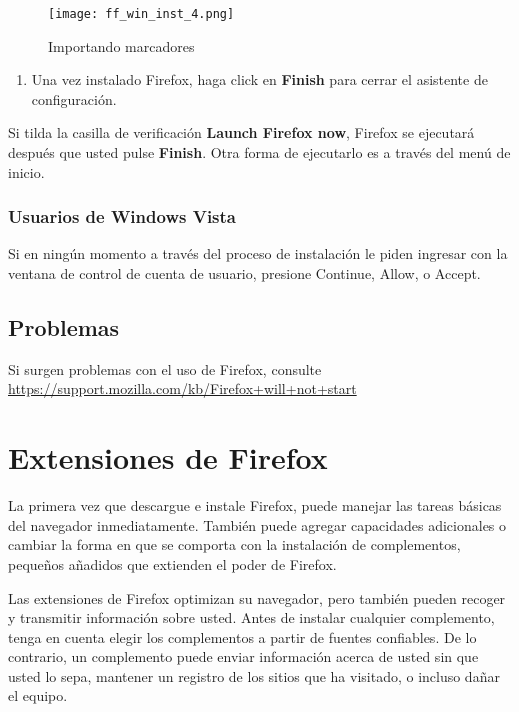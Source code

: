\documentclass[10pt,a5paper,twoside,,]{book}
\providecommand{\tightlist}{%
  \setlength{\itemsep}{0pt}\setlength{\parskip}{0pt}}
\begin{document}
\begin{figure}[htbp]
\centering
\texttt{[image: ff\_win\_inst\_4.png]}
\caption{Importando marcadores}
\end{figure}

\begin{enumerate}
\def\labelenumi{\arabic{enumi}.}
\setcounter{enumi}{7}
\tightlist
\item
  Una vez instalado Firefox, haga click en \textbf{Finish} para cerrar
  el asistente de configuración.
\end{enumerate}

Si tilda la casilla de verificación \textbf{Launch Firefox now}, Firefox
se ejecutará después que usted pulse \textbf{Finish}. Otra forma de
ejecutarlo es a través del menú de inicio.

\subsection{Usuarios de Windows Vista}\label{usuarios-de-windows-vista}

Si en ningún momento a través del proceso de instalación le piden
ingresar con la ventana de control de cuenta de usuario, presione
Continue, Allow, o Accept.

\section{Problemas}\label{problemas}

Si surgen problemas con el uso de Firefox, consulte
\url{https://support.mozilla.com/kb/Firefox+will+not+start}

\chapter{Extensiones de Firefox}\label{extensiones-de-firefox}

La primera vez que descargue e instale Firefox, puede manejar las tareas
básicas del navegador inmediatamente. También puede agregar capacidades
adicionales o cambiar la forma en que se comporta con la instalación de
complementos, pequeños añadidos que extienden el poder de Firefox.

Las extensiones de Firefox optimizan su navegador, pero también pueden
recoger y transmitir información sobre usted. Antes de instalar
cualquier complemento, tenga en cuenta elegir los complementos a partir
de fuentes confiables. De lo contrario, un complemento puede enviar
información acerca de usted sin que usted lo sepa, mantener un registro
de los sitios que ha visitado, o incluso dañar el equipo.
\end{document}
